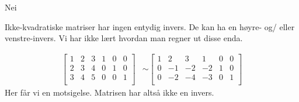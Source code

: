 \documentclass[11pt, a4paper, norsk]{NTNUoving}
\begin{document}
\begin{oppgave}[2]
    \begin{punkt}
        Nei
    \end{punkt}
    
    \begin{punkt}
        Ikke-kvadratiske matriser har ingen entydig invers. De kan ha en høyre- og/ eller venstre-invers. Vi har ikke lært hvordan man regner ut disse enda.
    \end{punkt}
    
    \begin{punkt}
        \begin{align*}
            \left[
                \begin{array}{ccc|ccc}
                1 & 2 & 3 & 1 & 0 & 0 \\
                2 & 3 & 4 & 0 & 1 & 0 \\
                3 & 4 & 5 & 0 & 0 & 1 \\
                \end{array}
            \right]
            &\sim
            \left[
                \begin{array}{ccc|ccc}
                1 & 2 & 3 & 1 & 0 & 0 \\
                0 & -1 & -2 & -2 & 1 & 0 \\
                0 & -2 & -4 & -3 & 0 & 1 \\
                \end{array}
            \right]
        \end{align*}
        Her får vi en motsigelse. Matrisen har altså ikke en invers. 
    \end{punkt}
\end{oppgave}
\end{document}
